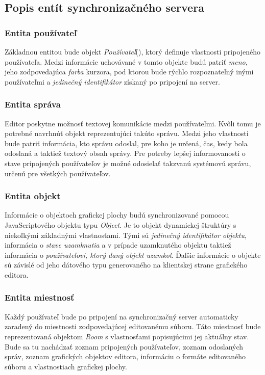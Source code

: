 \subsection{Popis entít synchronizačného servera}
\subsubsection{Entita používateľ}

Základnou entitou bude objekt \textit{Používateľ}(), ktorý definuje vlastnosti pripojeného používateľa. Medzi informácie uchovávané v tomto objekte budú patriť \textit{meno}, jeho zodpovedajúca \textit{farba} kurzora, pod ktorou bude rýchlo rozpoznateľný inými používateľmi a \textit{jedinečný identifikátor} získaný po pripojení na server.

\subsubsection{Entita správa}
Editor poskytne možnosť textovej komunikácie medzi používateľmi. Kvôli tomu je potrebné navrhnúť objekt reprezentujúci takúto správu. Medzi jeho vlastnosti bude patriť informácia, kto správu odoslal, pre koho je určená, čas, kedy bola odoslaná a taktiež textový obsah správy. Pre potreby lepšej informovanosti o stave pripojených používateľov je možné odosielať takzvanú systémovú správu, určenú pre všetkých používateľov.

\subsubsection{Entita objekt}
Informácie o objektoch grafickej plochy budú synchronizované pomocou JavaScriptového objektu typu \textit{Object}. Je to objekt dynamickej štruktúry s niekoľkými základnými vlastnosťami. Tými sú \textit{jedinečný identifikátor objektu}, informácia o \textit{stave uzamknutia} a v prípade uzamknutého objektu taktiež informácia o \textit{používateľovi, ktorý daný objekt uzamkol}. Ďalšie informácie o objekte sú závislé od jeho dátového typu generovaného na klientskej strane grafického editora.

\subsubsection{Entita miestnosť}
Každý používateľ bude po pripojení na synchronizačný server automaticky zaradený do miestnosti zodpovedajúcej editovanému súboru. Táto miestnosť bude reprezentovaná objektom \textit{Room} s vlastnosťami popisujúcimi jej aktuálny stav. Bude sa tu nachádzať zoznam pripojených používateľov, zoznam odoslaných správ, zoznam grafických objektov editora, informáciu o formáte editovaného súboru a vlastnostiach grafickej plochy.

